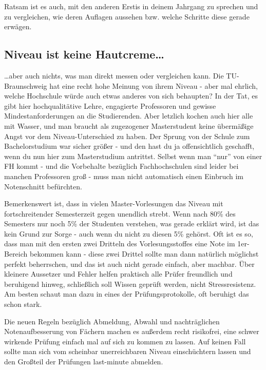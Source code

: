 \begin{multicols}{2}
Ratsam ist es auch, mit den anderen Erstis in deinem Jahrgang zu sprechen und zu vergleichen, wie deren Auflagen aussehen bzw. welche Schritte diese gerade erwägen.

\subsection{Niveau ist keine Hautcreme\ldots}
\ldots aber auch nichts, was man direkt messen oder vergleichen kann. Die TU-Braunschweig hat eine recht hohe Meinung von ihrem Niveau - aber mal ehrlich, welche Hochschule würde auch etwas anderes von sich behaupten? In der Tat, es gibt hier hochqualitätive Lehre, engagierte Professoren und gewisse Mindestanforderungen an die Studierenden. Aber letzlich kochen auch hier alle mit Wasser, und man braucht als zugezogener Masterstudent keine übermäßige Angst vor dem Niveau-Unterschied zu haben. Der Sprung von der Schule zum Bachelorstudium war sicher größer - und den hast du ja offensichtlich geschafft, wenn du nun hier zum Masterstudium antrittst. Selbst wenn man "`nur"' von einer FH kommt - und die Vorbehalte bezüglich Fachhochschulen sind leider bei manchen Professoren groß - muss man nicht automatisch einen Einbruch im Notenschnitt befürchten.

Bemerkenswert ist, dass in vielen Master-Vorlesungen das Niveau mit fortschreitender Semesterzeit gegen unendlich strebt. Wenn nach 80\% des Semesters nur noch 5\% der Studenten verstehen, was gerade erklärt wird, ist das kein Grund zur Sorge - auch wenn du nicht zu diesen 5\% gehörst. Oft ist es so, dass man mit den ersten zwei Dritteln des Vorlesungsstoffes eine Note im 1er-Bereich bekommen kann - diese zwei Drittel sollte man dann natürlich möglichst perfekt beherrschen, und das ist auch nicht gerade einfach, aber machbar. Über kleinere Aussetzer und Fehler helfen praktisch alle Prüfer freundlich und beruhigend hinweg, schließlich soll Wissen geprüft werden, nicht Stressresistenz. Am besten schaut man dazu in eines der Prüfungsprotokolle, oft beruhigt das schon stark.

Die neuen Regeln bezüglich Abmeldung, Abwahl und nachträglichen
Notenaufbesserung von Fächern machen es außerdem recht risikofrei, eine
schwer wirkende Prüfung einfach mal auf sich zu kommen zu lassen. Auf
keinen Fall sollte man sich vom scheinbar unerreichbaren Niveau
einschüchtern lassen und den Großteil der Prüfungen last-minute
abmelden.

\end{multicols}
